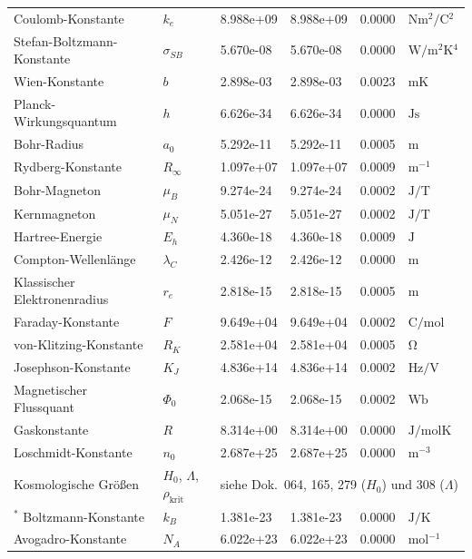\begin{longtable}{>{\raggedright}p{4.0cm}p{1.2cm}p{1.8cm}p{2.0cm}p{1.6cm}p{2.0cm}}
		Coulomb-Konstante & $k_e$ & 8.988e+09 & 8.988e+09 & 0.0000 & $\si{\newton \meter^2 \per \coulomb^2}$ \\
		Stefan-Boltzmann-Konstante & $\sigma_{SB}$ & 5.670e-08 & 5.670e-08 & 0.0000 & $\si{\watt \per \meter^2 \kelvin^4}$ \\
		Wien-Konstante & $b$ & 2.898e-03 & 2.898e-03 & 0.0023 & $\si{\meter \kelvin}$ \\
		Planck-Wirkungsquantum & $h$ & 6.626e-34 & 6.626e-34 & 0.0000 & $\si{\joule \second}$ \\
		Bohr-Radius & $a_0$ & 5.292e-11 & 5.292e-11 & 0.0005 & $\si{\meter}$ \\
		Rydberg-Konstante & $R_\infty$ & 1.097e+07 & 1.097e+07 & 0.0009 & $\si{\meter^{-1}}$ \\
		Bohr-Magneton & $\mu_B$ & 9.274e-24 & 9.274e-24 & 0.0002 & $\si{\joule \per \tesla}$ \\
		Kernmagneton & $\mu_N$ & 5.051e-27 & 5.051e-27 & 0.0002 & $\si{\joule \per \tesla}$ \\
		Hartree-Energie & $E_h$ & 4.360e-18 & 4.360e-18 & 0.0009 & $\si{\joule}$ \\
		Compton-Wellenlänge & $\lambda_C$ & 2.426e-12 & 2.426e-12 & 0.0000 & $\si{\meter}$ \\
		Klassischer Elektronenradius & $r_e$ & 2.818e-15 & 2.818e-15 & 0.0005 & $\si{\meter}$ \\
		Faraday-Konstante & $F$ & 9.649e+04 & 9.649e+04 & 0.0002 & $\si{\coulomb \per \mole}$ \\
		von-Klitzing-Konstante & $R_K$ & 2.581e+04 & 2.581e+04 & 0.0005 & $\si{\ohm}$ \\
		Josephson-Konstante & $K_J$ & 4.836e+14 & 4.836e+14 & 0.0002 & $\si{\hertz \per \volt}$ \\
		Magnetischer Flussquant & $\Phi_0$ & 2.068e-15 & 2.068e-15 & 0.0002 & $\si{\weber}$ \\
		Gaskonstante & $R$ & 8.314e+00 & 8.314e+00 & 0.0000 & $\si{\joule \per \mole \kelvin}$ \\
		Loschmidt-Konstante & $n_0$ & 2.687e+25 & 2.687e+25 & 0.0000 & $\si{\meter^{-3}}$ \\
		Kosmologische Größen & $H_0$, $\Lambda$, $\rho_{\text{krit}}$ & \multicolumn{4}{l}{siehe Dok.~064, 165, 279 ($H_0$) und 308 ($\Lambda$)} \\$^*$
		Boltzmann-Konstante & $k_B$ & 1.381e-23 & 1.381e-23 & 0.0000 & $\si{\joule \per \kelvin}$ \\
		Avogadro-Konstante & $N_A$ & 6.022e+23 & 6.022e+23 & 0.0000 & $\si{\mole^{-1}}$ \\
	\end{longtable}
	\normalsize
	
